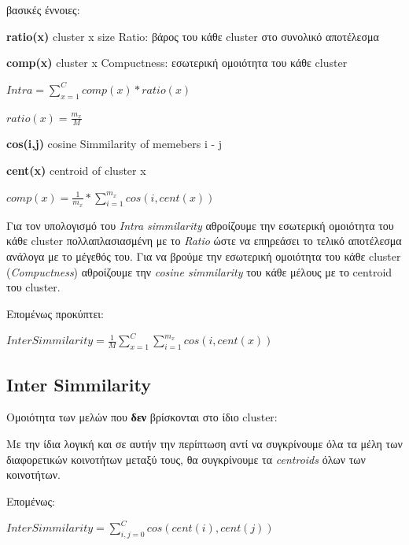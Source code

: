 βασικές έννοιες:
\begin{description}
\item \textbf{ratio(x)} cluster x size Ratio: βάρος του κάθε cluster στο συνολικό αποτέλεσμα
\item \textbf{comp(x)} cluster x Compuctness: εσωτερική ομοιότητα του κάθε cluster
\end{description} 


$ Intra = \sum\limits_{x=1}^C  comp(x) * ratio(x) $

$ ratio(x) = \frac{m_x}{M} $

\begin{description}
\item \textbf{cos(i,j)} cosine Simmilarity of memebers i - j 
\item \textbf{cent(x)} centroid of cluster x
\end{description} 


$ comp(x) = \frac{1}{m_x} * \sum\limits_{i=1}^{m_x} cos(i,cent(x)) $

Για τον υπολογισμό του \emph{Intra simmilarity} αθροίζουμε την εσωτερική ομοιότητα του κάθε cluster
πολλαπλασιασμένη με το \emph{Ratio} ώστε να επηρεάσει το τελικό αποτέλεσμα ανάλογα με το μέγεθός του.
Για να βρούμε την εσωτερική ομοιότητα του κάθε cluster (\emph{Compuctness}) αθροίζουμε την \emph{cosine simmilarity} 
του κάθε μέλους με το centroid του cluster. 

Επομένως προκύπτει:

$ InterSimmilarity = \frac{1}{M} \sum\limits_{x=1}^C \sum\limits_{i=1}^{m_x} cos(i,cent(x)) $

\subsection{Inter Simmilarity}
\noindent
Ομοιότητα των μελών που \textbf{δεν} βρίσκονται στο ίδιο cluster:

Με την ίδια λογική και σε αυτήν την περίπτωση αντί να συγκρίνουμε όλα τα μέλη των διαφορετικών κοινοτήτων
μεταξύ τους, θα συγκρίνουμε τα \emph{centroids} όλων των κοινοτήτων. 

Επομένως:

$ Inter Simmilarity = \sum\limits_{i,j=0}^C cos(cent(i),cent(j)) $

